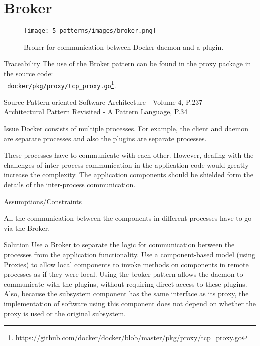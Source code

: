 \section{Broker}
\begin{figure}[H]
\centering
\texttt{[image: 5-patterns/images/broker.png]}
\caption{Broker for communication between Docker daemon and a plugin.}
\label{fig:broker-pattern}
\end{figure}

\begin{patdescription}
\item [Traceability]
The use of the Broker pattern can be found in the proxy package in the source code:\\
\verb| docker/pkg/proxy/tcp_proxy.go|\footnote{\url{https://github.com/docker/docker/blob/master/pkg/proxy/tcp_proxy.go}}.

\item [Source]
Pattern-oriented Software Architecture - Volume 4, P.237 \cite{wiley4} \\
Architectural Pattern Revisited - A Pattern Language, P.34 \cite{avgeriou2005architectural}

\item [Issue]
Docker consists of multiple processes. For example, the client and daemon are separate processes and also the plugins are separate processes.

These processes have to communicate with each other. However, dealing with the challenges of inter-process communication in the application code would greatly increase the complexity.
The application components should be shielded form the details of the inter-process communication.

\item [Assumptions/Constraints]
\begin{mynesteditemlist}
\item All the communication between the components in different processes have to go via the Broker.
\end{mynesteditemlist}

\item [Solution]
Use a Broker to separate the logic for communication between the processes from the application functionality. Use a component-based model (using Proxies) to allow local components to invoke methods on components in remote processes as if they were local.
Using the broker pattern allows the daemon to communicate with the plugins, without requiring direct access to these plugins.
Also, because the subsystem component has the same interface as its proxy, the implementation of software using this component does not depend on whether the proxy is used or the original subsystem.



\end{patdescription}
